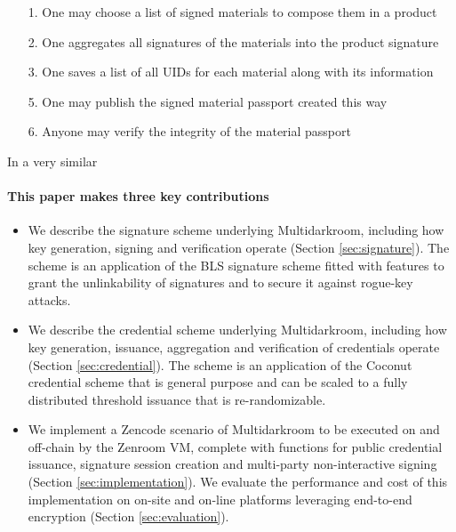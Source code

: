 \documentclass[twocolumn]{article}
\begin{document}
\begin{itemize}
  \item[1.] One may choose a list of signed materials to compose them in a product
  \item[2.] One aggregates all signatures of the materials into the product signature
  \item[3.] One saves a list of all UIDs for each material along with its information
  \item[5.] One may publish the signed material passport created this way 
  \item[6.] Anyone may verify the integrity of the material passport
\end{itemize}

In a very similar 

\paragraph*{This paper makes three key contributions}

\begin{itemize}
\item We describe the signature scheme underlying Multidarkroom, including how
  key generation, signing and verification operate (Section
  \ref{sec:signature}). The scheme is an application of the BLS signature scheme
  \citep{asiacrypt-bls} fitted with features to grant the unlinkability of
  signatures and to secure it against rogue-key attacks.
\item We describe the credential scheme underlying Multidarkroom, including how
  key generation, issuance, aggregation and verification of credentials operate
  (Section \ref{sec:credential}). The scheme is an application of the Coconut
  credential scheme \citep{coconut-2018} that is general purpose and can be
  scaled to a fully distributed threshold issuance that is re-randomizable.
\item We implement a Zencode scenario of Multidarkroom to be executed on and
  off-chain by the Zenroom VM, complete with functions for public credential
  issuance, signature session creation and multi-party non-interactive signing
  (Section \ref{sec:implementation}). We evaluate the performance and cost of
  this implementation on on-site and on-line platforms leveraging end-to-end
  encryption (Section \ref{sec:evaluation}).
\end{itemize}
\end{document}
